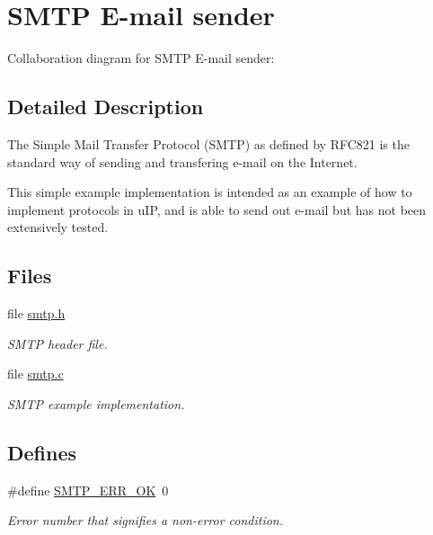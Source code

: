 \hypertarget{a00080}{
\section{SMTP E-mail sender}
\label{a00080}
}


Collaboration diagram for SMTP E-mail sender:

\subsection{Detailed Description}
The Simple Mail Transfer Protocol (SMTP) as defined by RFC821 is the standard way of sending and transfering e-mail on the Internet. 

This simple example implementation is intended as an example of how to implement protocols in u\-IP, and is able to send out e-mail but has not been extensively tested. 

\subsection*{Files}
\begin{CompactItemize}
\item 
file \hyperlink{a00042}{smtp.h}
\begin{CompactList}\small\item\em SMTP header file. \item\end{CompactList}

\item 
file \hyperlink{a00041}{smtp.c}
\begin{CompactList}\small\item\em SMTP example implementation. \item\end{CompactList}

\end{CompactItemize}
\subsection*{Defines}
\begin{CompactItemize}
\item 
\hypertarget{a00080_g029256bc17a12e1e86781887e11c0c7d}{
\#define \hyperlink{a00080_g029256bc17a12e1e86781887e11c0c7d}{SMTP\_\-ERR\_\-OK}~0}
\label{a00080_g029256bc17a12e1e86781887e11c0c7d}

\begin{CompactList}\small\item\em Error number that signifies a non-error condition. \item\end{CompactList}\end{CompactItemize}

